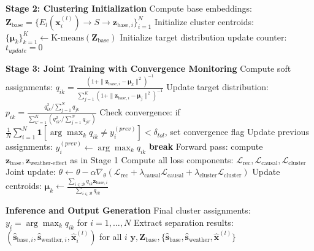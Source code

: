\documentclass[journal]{IEEEtran}
\begin{document}
\begin{algorithm}[h!]
\begin{algorithmic}[1]
\STATE \textbf{Stage 2: Clustering Initialization}
\STATE Compute base embeddings: $\mathbf{Z}_{\text{base}} = \{E_l(\mathbf{x}_i^{(l)}) \rightarrow S \rightarrow \mathbf{z}_{\text{base},i}\}_{i=1}^N$
\STATE Initialize cluster centroids: $\{\boldsymbol{\mu}_k\}_{k=1}^K \leftarrow \text{K-means}(\mathbf{Z}_{\text{base}})$
\STATE Initialize target distribution update counter: $t_{update} = 0$

\STATE \textbf{Stage 3: Joint Training with Convergence Monitoring}
        \STATE Compute soft assignments: $q_{ik} = \frac{(1 + \|\mathbf{z}_{\text{base},i} - \boldsymbol{\mu}_k\|^2)^{-1}}{\sum_{j=1}^K (1 + \|\mathbf{z}_{\text{base},i} - \boldsymbol{\mu}_j\|^2)^{-1}}$
        \STATE Update target distribution: $p_{ik} = \frac{q_{ik}^2 / \sum_{j=1}^N q_{jk}}{\sum_{k'=1}^K (q_{ik'}^2 / \sum_{j=1}^N q_{jk'})}$
        \STATE Check convergence: if $\frac{1}{N}\sum_{i=1}^N \mathbf{1}[\arg\max_k q_{ik} \neq y_i^{(prev)}] < \delta_{tol}$, set convergence flag
        \STATE Update previous assignments: $y_i^{(prev)} \leftarrow \arg\max_k q_{ik}$
    \ENDIF
        \STATE \textbf{break}
    \ENDIF
        \STATE Forward pass: compute $\mathbf{z}_{\text{base}}, \mathbf{z}_{\text{weather-effect}}$ as in Stage 1
        \STATE Compute all loss components: $\mathcal{L}_{\text{rec}}, \mathcal{L}_{\text{causal}}, \mathcal{L}_{\text{cluster}}$
        \STATE Joint update: $\theta \leftarrow \theta - \alpha \nabla_\theta (\mathcal{L}_{\text{rec}} + \lambda_{\text{causal}} \mathcal{L}_{\text{causal}} + \lambda_{\text{cluster}} \mathcal{L}_{\text{cluster}})$
        \STATE Update centroids: $\boldsymbol{\mu}_k \leftarrow \frac{\sum_{i \in \mathcal{B}} q_{ik} \mathbf{z}_{\text{base},i}}{\sum_{i \in \mathcal{B}} q_{ik}}$
    \ENDFOR
\ENDFOR

\STATE \textbf{Inference and Output Generation}
\STATE Final cluster assignments: $y_i = \arg\max_k q_{ik}$ for $i = 1, \ldots, N$
\STATE Extract separation results: $(\hat{\mathbf{s}}_{\text{base},i}, \hat{\mathbf{s}}_{\text{weather},i}, \hat{\mathbf{x}}_i^{(l)})$ for all $i$
\RETURN $\mathbf{y}, \mathbf{Z}_{\text{base}}, \{\hat{\mathbf{s}}_{\text{base}}, \hat{\mathbf{s}}_{\text{weather}}, \hat{\mathbf{x}}^{(l)}\}$
\end{algorithmic}
\end{algorithm}
\end{document}

